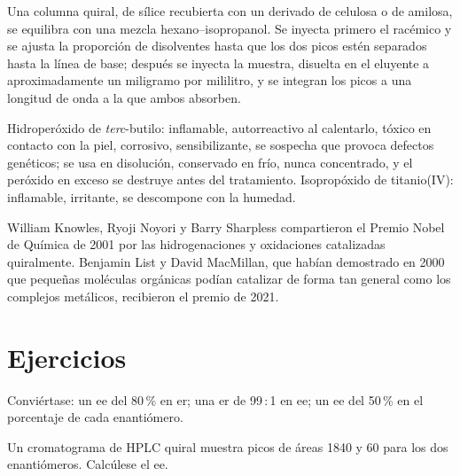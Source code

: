 \begin{inthelab}
Una columna quiral, de sílice recubierta con un derivado de celulosa o de amilosa, se
equilibra con una mezcla hexano--isopropanol. Se inyecta primero el racémico
y se ajusta la proporción de disolventes hasta que los dos picos estén separados hasta la línea de base; después
se inyecta la muestra, disuelta en el eluyente a aproximadamente un miligramo por mililitro,
y se integran los picos a una longitud de onda a la que ambos absorben.
\end{inthelab}

\begin{safety}{}
Hidroperóxido de \textit{terc}-butilo: inflamable, autorreactivo al calentarlo, tóxico en contacto con la
piel, corrosivo, sensibilizante, se sospecha que provoca defectos genéticos; se usa
en disolución, conservado en frío, nunca concentrado, y el peróxido en exceso se destruye
antes del tratamiento. Isopropóxido de titanio(IV): inflamable, irritante, se descompone con la
humedad.
\end{safety}

\begin{history}
William Knowles, Ryoji Noyori y Barry Sharpless compartieron el Premio Nobel
de Química de 2001 por las hidrogenaciones y oxidaciones catalizadas quiralmente. Benjamin List
y David MacMillan, que habían demostrado en 2000 que pequeñas moléculas orgánicas podían
catalizar  de forma tan general como los complejos metálicos, recibieron
el premio de 2021.
\end{history}

\section{Ejercicios}

\begin{exercise}[$\star$]\label{exo:b3:asymmetric-synthesis:1}
Conviértase: un ee del 80\,\% en er; una er de 99\,:\,1 en ee; un ee del 50\,\% en el porcentaje de cada
enantiómero.
\end{exercise}

\begin{exercise}[$\star$]\label{exo:b3:asymmetric-synthesis:2}
Un cromatograma de HPLC quiral muestra picos de áreas 1840 y 60 para los dos enantiómeros.
Calcúlese el ee.
\end{exercise}


